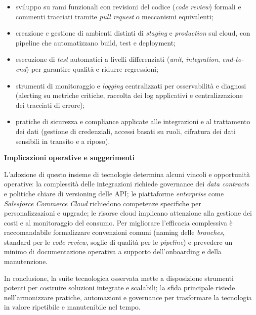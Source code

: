 \begin{itemize}
\item sviluppo su rami funzionali con revisioni del codice (\emph{code review}) formali e commenti tracciati tramite \emph{pull request} o meccanismi equivalenti;
\item creazione e gestione di ambienti distinti di \emph{staging} e \emph{production} sul cloud, con pipeline che automatizzano build, test e deployment;
\item esecuzione di \emph{test} automatici a livelli differenziati (\emph{unit}, \emph{integration}, \emph{end-to-end}) per garantire qualità e ridurre regressioni;
\item strumenti di monitoraggio e \emph{logging} centralizzati per osservabilità e diagnosi (alerting su metriche critiche, raccolta dei log applicativi e centralizzazione dei tracciati di errore);
\item pratiche di sicurezza e compliance applicate alle integrazioni e al trattamento dei dati (gestione di credenziali, accessi basati su ruoli, cifratura dei dati sensibili in transito e a riposo).
\end{itemize}

\medskip

\noindent\textbf{Implicazioni operative e suggerimenti}

L’adozione di questo insieme di tecnologie determina alcuni vincoli e opportunità operative: la complessità delle integrazioni richiede governance dei \emph{data contracts} e 
politiche chiare di versioning delle API; le piattaforme \emph{enterprise} come \emph{Salesforce Commerce Cloud} richiedono competenze specifiche per personalizzazioni e upgrade; 
le risorse cloud implicano attenzione alla gestione dei costi e al monitoraggio del consumo. Per migliorare l’efficacia complessiva è raccomandabile formalizzare convenzioni comuni 
(naming delle \emph{branches}, standard per le \emph{code review}, soglie di qualità per le \emph{pipeline}) e prevedere un minimo di documentazione operativa a supporto dell’onboarding e della manutenzione.

In conclusione, la suite tecnologica osservata mette a disposizione strumenti potenti per costruire soluzioni integrate e scalabili; la sfida principale risiede nell’armonizzare pratiche, 
automazioni e governance per trasformare la tecnologia in valore ripetibile e manutenibile nel tempo.



